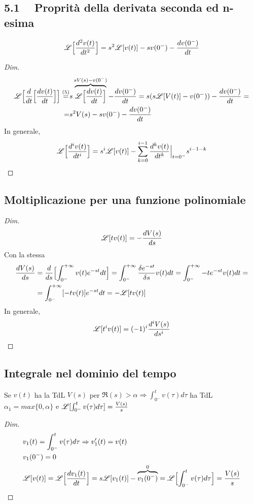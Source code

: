 \subsection*{5.1$\quad$ Proprità della derivata seconda ed n-esima}
\[
   \mathscr{L}\Bigl[\frac{d^2v(t)}{dt^2}\Bigr] = s^2\mathscr{L}[v(t)] - sv(0^-) - \frac{dv(0^-)}{dt}
\]
\begin{proof}[Dim]
   \[
      \begin{split}
         \mathscr{L}\Bigl[\frac{d}{dt}\Bigl[\frac{dv(t)}{dt}\Bigr]\Bigr]\overset{(5)}{=} & s\overbrace{\mathscr{L}\Bigl[\frac{dv(t)}{dt}\Bigr]}^{sV(s) - v(0^-)} - \frac{dv(0^-)}{dt} = s(s\mathscr{L}[V(t)] - v(0^-)) - \frac{dv(0^-)}{dt} = \\
         = & s^2V(s) - sv(0^-) - \frac{dv(0^-)}{dt}
      \end{split}
   \]
   In generale,
   \[
      \mathscr{L}\Bigl[\frac{d^iv(t)}{dt^i}\Bigr] = s^i\mathscr{L}[v(t)] - \sum_{k = 0}^{i - 1}\frac{d^kv(t)}{dt^k}\Big|_{t = 0^-}s^{i - 1 - k}
   \]
\end{proof}
\subsection{Moltiplicazione per una funzione polinomiale}
\begin{proof}[Dim]
\[
   \mathscr{L}[tv(t)] = - \frac{dV(s)}{ds}
\]
Con la stessa \RdC
   \[
      \begin{split}
         \frac{dV(s)}{ds} & = \frac{d}{ds}\Bigl[\int_{0^-}^{+\infty} v(t)e^{-st}dt\Bigr] = \int_{0^-}^{+\infty} \frac{\delta e^{-st}}{\delta s}v(t)dt = \int_{0^-}^{+\infty} -te^{-st}v(t) dt =\\
         & = \int_{0^-}^{+\infty}[-tv(t)]e^{-st}dt = - \mathscr{L}[tv(t)]
      \end{split}
   \]
   In generale,
   \[
      \mathscr{L}[t^iv(t)] = (-1)^i\frac{d^iV(s)}{ds^i}
   \]
\end{proof}
\subsection{Integrale nel dominio del tempo}
Se $v(t)$ ha la TdL $V(s)$ per $\Re(s) > \alpha \Longrightarrow \int_{0^-}^tv(\tau)d\tau$ ha TdL $\alpha_1 = max\{0, \alpha\}$ e $\mathscr{L}[\int_{0^-}^tv(\tau)d\tau] = \frac{V(s)}{s}$
\begin{proof}[Dim]
   \[
      \begin{split}
         & v_1(t) = \int_{0^-}^tv(\tau)d\tau \Rightarrow v_1'(t) = v(t)\\
         & v_1(0^-) = 0\\
         & \mathscr{L}[v(t)] = \mathscr{L}\Bigl[\frac{dv_1(t)}{dt}\Bigr] = s\mathscr{L}[v_1(t)] - \overbrace{v_1(0^-)}^{0} = \mathscr{L}\Bigl[\int_{0^-}^tv(\tau)d\tau\Bigr] = \frac{V(s)}{s}
      \end{split}
   \]
\end{proof}
